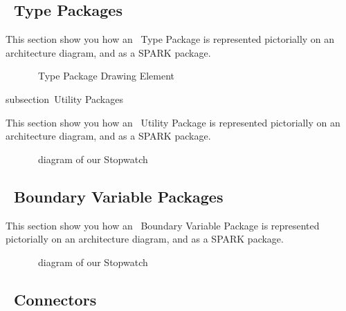 \subsection{\informed\ Type Packages}

This section show you how an \informed\ Type Package is represented pictorially on an architecture
diagram, and as a SPARK package.

\begin{figure}[h]
  \begin{center}
  \end{center}
  \caption{\informed\ Type Package Drawing Element}
\end{figure}


subsection{\informed\ Utility Packages}

This section show you how an \informed\ Utility Package is represented pictorially on an architecture
diagram, and as a SPARK package.

 \begin{figure}[h]
  \begin{center}
  \end{center}
  \caption{\informed\ diagram of our Stopwatch}
\end{figure}


\subsection{\informed\ Boundary Variable Packages}

This section show you how an \informed\ Boundary Variable Package is represented pictorially on an architecture
diagram, and as a SPARK package.

\begin{figure}[h]
  \begin{center}
  \end{center}
  \caption{\informed\ diagram of our Stopwatch}
\end{figure}

\subsection{\informed\ Connectors}
